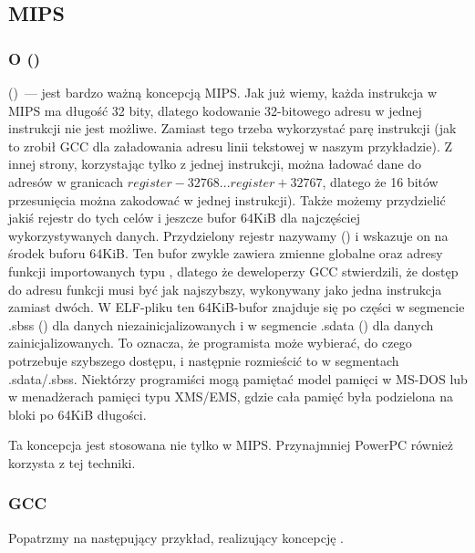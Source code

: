 \subsection{MIPS}

\subsubsection{O  ()}
\label{MIPS_GP}

 ()~--- jest bardzo ważną koncepcją MIPS.
Jak już wiemy, każda instrukcja w MIPS ma długość 32 bity, dlatego kodowanie 32-bitowego adresu w jednej instrukcji nie jest możliwe. Zamiast tego trzeba wykorzystać parę instrukcji
(jak to zrobił GCC dla załadowania adresu linii tekstowej w naszym przykładzie).
Z innej strony, korzystając tylko z jednej instrukcji, 
można ładować dane do adresów w granicach $register-32768...register+32767$, dlatego że 16 bitów
przesunięcia można zakodować w jednej instrukcji).
Także możemy przydzielić jakiś rejestr do tych celów i jeszcze bufor 64KiB dla najczęściej wykorzystywanych danych.
Przydzielony rejestr nazywamy  () i wskazuje on na środek buforu 64KiB.
Ten bufor zwykle zawiera zmienne globalne oraz adresy funkcji importowanych typu \printf,
dlatego że deweloperzy GCC stwierdzili, że dostęp do adresu funkcji musi być jak najszybszy,
wykonywany jako jedna instrukcja zamiast dwóch.
W ELF-pliku ten 64KiB-bufor znajduje się po części w segmencie .sbss () dla danych niezainicjalizowanych i w segmencie .sdata () dla danych zainicjalizowanych.
To oznacza, że programista może wybierać, do czego potrzebuje szybszego dostępu, i następnie rozmieścić to
w segmentach .sdata/.sbss.
Niektórzy  programiści mogą pamiętać model pamięci w MS-DOS  
lub w menadżerach pamięci typu XMS/EMS, gdzie cała pamięć była podzielona na bloki po 64KiB długości.

Ta koncepcja jest stosowana nie tylko w MIPS. Przynajmniej PowerPC również korzysta z tej techniki.

\subsubsection{\Optimizing GCC}

Popatrzmy na następujący przykład, realizujący koncepcję .

